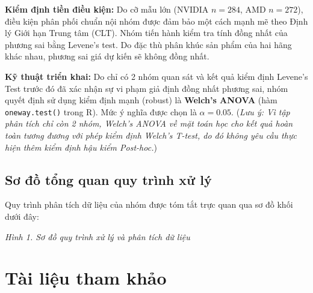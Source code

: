 \documentclass[12pt,a4paper]{article}
\begin{document}
\textbf{Kiểm định tiền điều kiện:} Do cỡ mẫu lớn (NVIDIA $n=284$, AMD $n=272$), điều
kiện phân phối chuẩn nội nhóm được đảm bảo một cách mạnh mẽ theo Định lý Giới hạn Trung
tâm (CLT). Nhóm tiến hành kiểm tra tính đồng nhất của phương sai bằng Levene's test. Do
đặc thù phân khúc sản phẩm của hai hãng khác nhau, phương sai giá dự kiến sẽ không đồng
nhất.

\textbf{Kỹ thuật triển khai:} Do chỉ có 2 nhóm quan sát và kết quả kiểm định Levene's
Test trước đó đã xác nhận sự vi phạm giả định đồng nhất phương sai, nhóm quyết định sử
dụng kiểm định mạnh (robust) là \textbf{Welch's ANOVA} (hàm \texttt{oneway.test()} trong
R). Mức ý nghĩa được chọn là $\alpha = 0.05$. (\textit{Lưu ý: Vì tập phân tích chỉ còn
2 nhóm, Welch's ANOVA về mặt toán học cho kết quả hoàn toàn tương đương với phép kiểm
định Welch's T-test, do đó không yêu cầu thực hiện thêm kiểm định hậu kiểm Post-hoc.})

\subsection{Sơ đồ tổng quan quy trình xử lý}

Quy trình phân tích dữ liệu của nhóm được tóm tắt trực quan qua sơ đồ khối dưới đây:

\begin{center}
  \textit{Hình 1. Sơ đồ quy trình xử lý và phân tích dữ liệu}
\end{center}

\section*{Tài liệu tham khảo}
\end{document}
